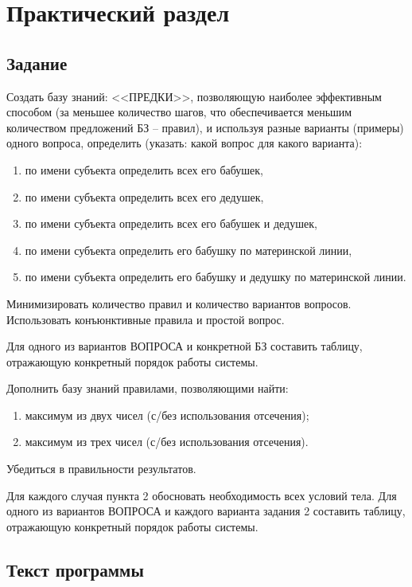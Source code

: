 \chapter{Практический раздел}

\section{Задание}

Создать базу знаний: <<ПРЕДКИ>>, позволяющую наиболее эффективным способом (за меньшее количество шагов, что обеспечивается меньшим количеством предложений БЗ -- правил), и используя разные варианты (примеры) одного вопроса, определить (указать: какой вопрос для какого варианта):

\begin{enumerate}
	\item по имени субъекта определить всех его бабушек,
	\item по имени субъекта определить всех его дедушек,
	\item по имени субъекта определить всех его бабушек и дедушек,
	\item по имени субъекта определить его бабушку по материнской линии,
	\item по имени субъекта определить его бабушку и дедушку по материнской линии.
\end{enumerate}

Минимизировать количество правил и количество вариантов вопросов. Использовать конъюнктивные правила и простой вопрос.

Для одного из вариантов ВОПРОСА и конкретной БЗ составить таблицу, отражающую конкретный порядок работы системы.

Дополнить базу знаний правилами, позволяющими найти:

\begin{enumerate}
	\item максимум из двух чисел (с/без использования отсечения);
	\item максимум из трех чисел (с/без использования отсечения).
\end{enumerate}

Убедиться в правильности результатов.

Для каждого случая пункта 2 обосновать необходимость всех условий тела. Для одного из вариантов ВОПРОСА и каждого варианта задания 2 составить таблицу, отражающую конкретный порядок работы системы.

\clearpage

\section{Текст программы}

